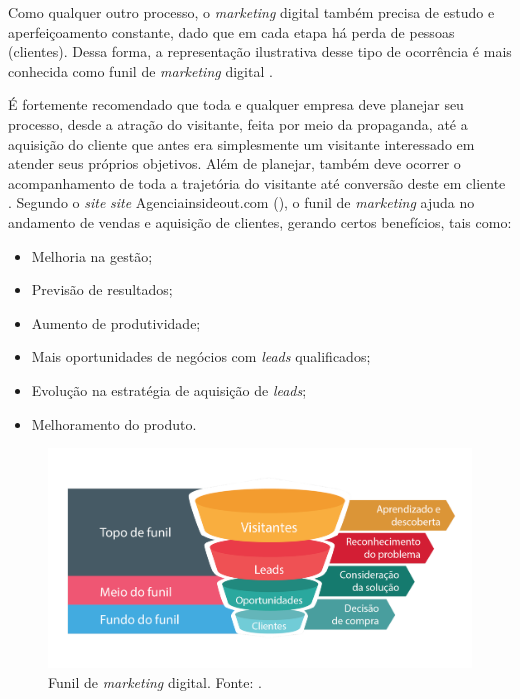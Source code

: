Como qualquer outro processo, o \textit{marketing} digital também precisa de estudo e aperfeiçoamento constante, dado que em cada etapa há perda de pessoas (clientes). Dessa forma, a representação ilustrativa desse tipo de ocorrência é mais conhecida como funil de \textit{marketing} digital \cite{BORGES:2017}.

É fortemente recomendado que toda e qualquer empresa deve planejar seu processo, desde a atração do visitante, feita por meio da propaganda, até a aquisição do cliente que antes era simplesmente um visitante interessado em atender seus próprios objetivos. Além de planejar, também deve ocorrer o acompanhamento de toda a trajetória do visitante até conversão deste em cliente \cite{INSIDEOUT:2018}.
Segundo o \textit{site} \textit{site} Agenciainsideout.com (\citeyear{INSIDEOUT:2018}), o funil de \textit{marketing} ajuda no andamento de vendas e aquisição de clientes, gerando certos benefícios, tais como:

\begin{itemize}
    \item Melhoria na gestão;
    
    \item Previsão de resultados;
    
    \item Aumento de produtividade;
    
    \item Mais oportunidades de negócios com \textit{leads} qualificados;
    
    \item Evolução na estratégia de aquisição de \textit{leads};
    
    \item Melhoramento do produto.

\end{itemize}

\begin{figure}[H]
    \centering
    \includegraphics[scale=0.2]{figuras/referencial_teorico/funil_marketing.png}
    \caption[Funil de \textit{marketing} digital]{Funil de \textit{marketing} digital. Fonte: \cite{INSIDEOUT:2018}.}
    \label{fig:funil_marketing}
\end{figure}

